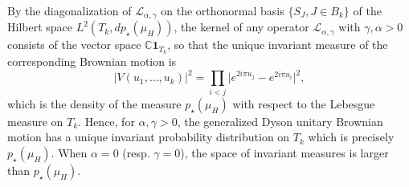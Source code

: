 \documentclass[10pt,11pt]{amsart}%
\begin{document}
By the diagonalization of $\mathcal{L}_{\alpha,\gamma}$ on the orthonormal basis $\{S_{J}, J\in B_k\}$ of the Hilbert space $L^2( T_{k},dp_{\star}(\mu_H))$, the kernel of any operator $\mathcal{L}_{\alpha,\gamma}$ with $\gamma,\alpha>0$ consists of the vector space $\mathbb{C}\mathbf{1}_{T_k}$, so that the unique invariant measure of the corresponding Brownian motion is
$$\vert V(u_1,\ldots,u_k)\vert^2=\prod_{i<j}\vert e^{2i\pi u_j}-e^{2i\pi u_i}\vert^2,$$
which is the density of the measure $p_{\star}(\mu_H)$ with respect to the Lebesgue measure on $ T_{k}$. Hence, for $\alpha,\gamma>0$, the generalized Dyson unitary Brownian motion has a unique invariant probability distribution on $ T_{k}$ which is precisely $p_{\star}(\mu_H)$.  When $\alpha=0$ (resp. $\gamma=0$), the space of invariant measures is larger than $p_{\star}(\mu_H)$.
\end{document}
